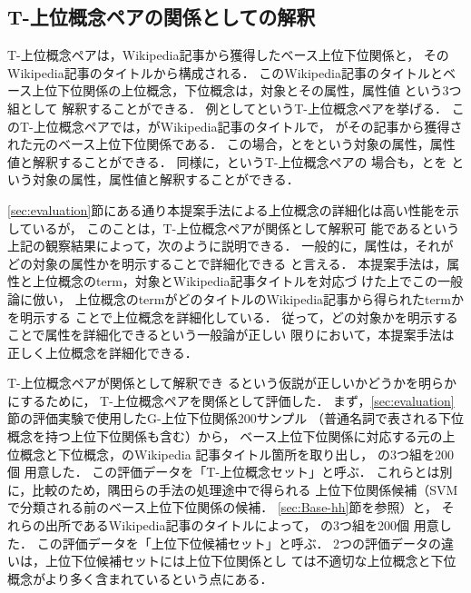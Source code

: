 \documentclass[japanese]{jnlp_1.4}
\newcommand{\thype}{}
\newcommand{\xmp}[1]{}
\newcommand{\isa}[2]{}
\newcommand{\attval}[3]{}
\begin{document}
\subsection{T-上位概念ペアの\attval{対象}{属性}{属性値}関係としての解釈}

T-上位概念ペアは，Wikipedia記事から獲得したベース上位下位関係と，
そのWikipedia記事のタイトルから構成される．
このWikipedia記事のタイトルとベース上位下位関係の上位概念，下位概念は，対象とその属性，属性値
という3つ組として
解釈することができる．
例として\isa{黒澤明の作品}{七人の侍}というT-上位概念ペアを挙げる．
このT-上位概念ペアでは，\xmp{黒澤明}がWikipedia記事のタイトルで，
\isa{作品}{七人の侍}がその記事から獲得された元のベース上位下位関係である．
この場合，\xmp{作品}と\xmp{七人の侍}を\xmp{黒澤明}という対象の属性，属性
値と解釈することができる．
同様に，\isa{シリコングラフィックスの製品}{IRIS Crimson}というT-上位概念ペアの
場合も，\xmp{製品}と\xmp{IRIS Crimson}を
\xmp{シリコングラフィックス}という対象の属性，属性値と解釈することができる．

\ref{sec:evaluation}節にある通り本提案手法による上位概念の詳細化は高い性能を示しているが，
このことは，T-上位概念ペアが\attval{対象}{属性}{属性値}関係として解釈可
能であるという上記の観察結果によって，次のように説明できる．
一般的に，属性は，それがどの対象の属性かを明示することで詳細化できる
と言える．
本提案手法は，属性と上位概念のterm，対象とWikipedia記事タイトルを対応づ
けた上でこの一般論に倣い，
上位概念のtermがどのタイトルのWikipedia記事から得られたtermかを明示する
ことで上位概念を詳細化している．
従って，どの対象かを明示することで属性を詳細化できるという一般論が正しい
限りにおいて，本提案手法は正しく上位概念を詳細化できる．

T-上位概念ペアが\attval{対象}{属性}{属性値}関係として解釈でき
るという仮説が正しいかどうかを明らかにするために，
T-上位概念ペアを\attval{対象}{属性}{属性値}関係として評価した．
まず，\ref{sec:evaluation}節の評価実験で使用したG-上位下位関係200サンプル
（普通名詞で表される下位概念を持つ上位下位関係も含む）から，
ベース上位下位関係に対応する元の上位概念と下位概念，\thype{}のWikipedia
記事タイトル箇所を取り出し，
\attval{Wikipedia記事タイトル}{上位概念}{下位概念}の3つ組を200個
用意した．
この評価データを「T-上位概念セット」と呼ぶ．
これらとは別に，比較のため，隅田らの手法の処理途中で得られる
上位下位関係候補（SVMで分類される前のベース上位下位関係の候補．
\ref{sec:Base-hh}節を参照）と，
それらの出所であるWikipedia記事のタイトルによって，
\attval{Wikipedia記事タイトル}{上位概念候補}{下位概念候補}の3つ組を200個
用意した．
この評価データを「上位下位候補セット」と呼ぶ．
2つの評価データの違いは，上位下位候補セットには上位下位関係とし
ては不適切な上位概念と下位概念がより多く含まれているという点にある．
\end{document}
